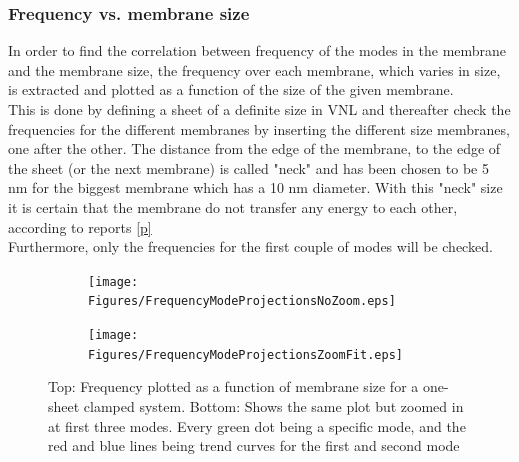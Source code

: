 \subsubsection{Frequency vs. membrane size}
In order to find the correlation between frequency of the modes in the membrane and the membrane size, the frequency over each membrane, which varies in size, is extracted and plotted as a function of the size of the given membrane. \\
This is done by defining a sheet of a definite size in VNL and thereafter check the frequencies for the different membranes by inserting the different size membranes, one after the other. The distance from the edge of the membrane, to the edge of the sheet (or the next membrane) is called "neck" and has been chosen to be 5 nm for the biggest membrane which has a 10 nm diameter. With this "neck" size it is certain that the membrane do not transfer any energy to each other, according to reports \cref{p} \\
Furthermore, only the frequencies for the first couple of modes will be checked.
\onecolumngrid

\begin{figure}[H]
\centering
\begin{subfigure}{\textwidth}
  \centering
  \vspace{-0.8em}
  \texttt{[image: Figures/FrequencyModeProjectionsNoZoom.eps]}
  \label{svfa}
  \vspace{-4.5em}
\end{subfigure}\vspace{1mm}
\begin{subfigure}{\textwidth}   
  \centering
  \texttt{[image: Figures/FrequencyModeProjectionsZoomFit.eps]}
  \label{svfb}
\end{subfigure}
\vspace{-4em}
\caption{Top: Frequency plotted as a function of membrane size for a one-sheet clamped system. Bottom: Shows the same plot but zoomed in at first three modes. Every green dot being a specific mode, and the red and blue lines being trend curves for the first and second mode}
\label{sizevsfrequency}
\end{figure}
\twocolumngrid

